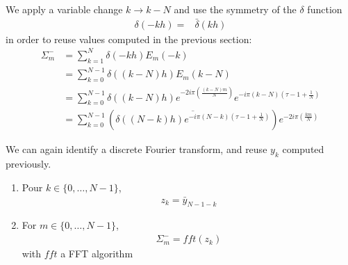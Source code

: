 We apply a variable change $k \rightarrow k-N$ and use the symmetry of the $\delta$ function
\begin{align*}
\delta(-kh)=&\bar{\delta}(kh)
\end{align*}
in order to reuse values computed in the previous section:
\begin{align*}
\Sigma_{m}^{-}&=\sum_{k=1}^{N}\delta(-kh)E_{m}(-k)\\
  &=\sum_{k=0}^{N-1}\delta((k-N)h)E_{m}(k-N)\\
  &=\sum_{k=0}^{N-1}\delta((k-N)h) e^{-2i\pi\left(\frac{(k-N) m}{N}\right)}e^{-i\pi (k-N)\left(\tau-1+\frac{1}{N}\right)}\\
  &=\sum_{k=0}^{N-1}\left(\overline{\delta((N-k)h) e^{-i\pi (N-k)\left(\tau-1+\frac{1}{N}\right)}}\right) e^{-2i\pi\left(\frac{k m}{N}\right)} 
\end{align*}

We can again identify a discrete Fourier transform, and reuse $y_k$ computed previously.
\begin{enumerate}
\item Pour $k\in\{0,\hdots,N-1\}$,
\begin{align}
z_{k}= \bar{y}_{N-1-k}
\end{align}
\item For $m \in\{0,\hdots,N-1\}$,
\begin{align}
  \Sigma_{m}^{-}=fft(z_{k})
\end{align}
with $fft$ a FFT algorithm
\end{enumerate}

